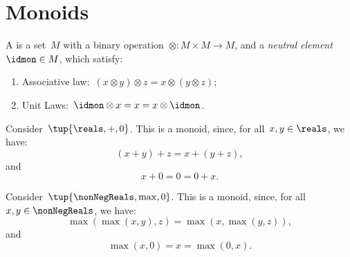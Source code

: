 

\section{Monoids}\label{sec:parallelism-monoids}

\begin{definition}[Monoid]\label{def:monoid}
    A  is a set~$M$ with a binary operation~$\otimes \colon M\times M\to M$, and a \emph{neutral element}~$\idmon\in M$, which satisfy:
    \begin{enumerate}
        \item Associative law:~$(x\otimes y)\otimes z=x\otimes (y\otimes z)$;
        \item Unit Laws:~$\idmon\otimes x=x=x\otimes \idmon$.
    \end{enumerate}
\end{definition}
\begin{example}
    Consider~$\tup{\reals,+,0}$. This is a monoid, since, for all~$x,y\in \reals$, we have:
    \begin{equation*}
    (x+y)
        +z=x+(y+z),
    \end{equation*}
    and
    \begin{equation*}
        x+0=0=0+x.
    \end{equation*}
\end{example}

\begin{example}
    Consider~$\tup{\nonNegReals,\max,0}$. This is a monoid, since, for all~$x,y\in \nonNegReals$, we have:
    \begin{equation*}
        \max(\max(x,y),z)=\max(x,\max(y,z)),
    \end{equation*}
    and
    \begin{equation*}
        \max(x,0)=x=\max(0,x).
    \end{equation*}
\end{example}

